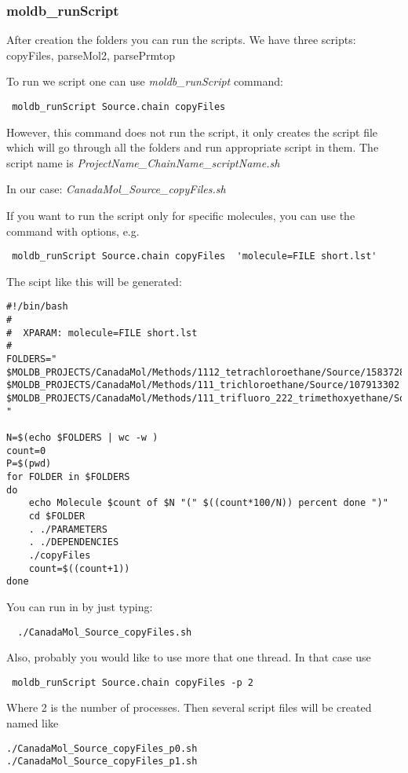 \documentclass[12pt]{article}
\begin{document}
\subsubsection{moldb\_runScript}

After creation the folders you can run the scripts.
We have three scripts: copyFiles, parseMol2, parsePrmtop

To run we script one can use \emph{moldb\_runScript} command:

\verb# moldb_runScript Source.chain copyFiles  #

However, this command does not run the script, it only creates the script file which will go through all the folders and run appropriate script in them.
The script name is 
  \emph{ProjectName\_ChainName\_scriptName.sh}

  In our case: 
   \emph{CanadaMol\_Source\_copyFiles.sh}

If you want to run the script only for specific molecules, you can use the command with options, e.g.

\verb# moldb_runScript Source.chain copyFiles  'molecule=FILE short.lst'#

The scipt like this will be generated:

\begin{verbatim}
#!/bin/bash
#
#  XPARAM: molecule=FILE short.lst
#
FOLDERS="
$MOLDB_PROJECTS/CanadaMol/Methods/1112_tetrachloroethane/Source/158372845
$MOLDB_PROJECTS/CanadaMol/Methods/111_trichloroethane/Source/107913302
$MOLDB_PROJECTS/CanadaMol/Methods/111_trifluoro_222_trimethoxyethane/Source/652622319
"

N=$(echo $FOLDERS | wc -w )
count=0
P=$(pwd)
for FOLDER in $FOLDERS
do
	echo Molecule $count of $N "(" $((count*100/N)) percent done ")"
	cd $FOLDER
	. ./PARAMETERS
	. ./DEPENDENCIES
	./copyFiles
	count=$((count+1))
done
\end{verbatim}

You can run in by just typing:

\verb$  ./CanadaMol_Source_copyFiles.sh $

Also, probably you would like to use more that one thread.
In that case use 

\verb# moldb_runScript Source.chain copyFiles -p 2  #

Where 2 is the number of processes.
Then several script files will be created named like

\begin{verbatim}
./CanadaMol_Source_copyFiles_p0.sh
./CanadaMol_Source_copyFiles_p1.sh
\end{verbatim}
 
\end{document}
